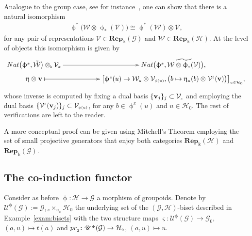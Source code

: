 \documentclass[11pt]{article}
\numberwithin{equation}{section}
\newcommand{\tensor}[1]{\otimes_{\scriptscriptstyle{#1}}}
\newcommand{\Rep}[1]{\mathbf{Rep}_{\Sscript{\Bbbk}}(#1)}
\newcommand{\Go}{\cG_{\Sscript{0}}}
\newcommand{\Ga}{\cG_{\Sscript{1}}}
\newcommand{\Ho}{\cH_{\Sscript{0}}}
\newcommand{\Vx}{\cV_{\Sscript{x}}}
\newcommand{\uU}{\mathscr{U}}
\newcommand{\cG}{{\mathcal G}}
\newcommand{\cH}{{\mathcal H}}
\newcommand{\cV}{{\mathcal V}}
\newcommand{\cW}{{\mathcal W}}
\newcommand{\Sscript}[1]{\scriptscriptstyle{#1}}
\newcommand{\due}[3]{{}_{{#2 }} {#1}_{{ #3}} }
\newcommand{\upg}{\uU^{\Sscript{\upphi}}(\cG)}
\begin{document}
\begin{Remark}\label{rem:PFromula}Analogue to the group case, see for instance~\cite[Proposition~2.10.18]{Kowalski:2014}, one can show that there is a natural isomorphism
\begin{gather*}
\upphi^{\Sscript{*}}\big( \cW \tensor{}\upphi_{\Sscript{*}}(\cV)\big) \cong \upphi^{\Sscript{*}}(\cW)\tensor{} \cV,
\end{gather*}
for any pair of representations $\cV \in \Rep{\cG}$ and $\cW \in \Rep{\cH}$. At the level of objects this isomorphism is given by
\begin{gather*}
\xymatrix@R=0pt{ {\rm Nat}\big(\upphi^{\Sscript{x}}, \tilde{\cW}\big) \tensor{\Bbbk} \Vx \ar@{->}^-{}[rr] & & {\rm Nat}\big(\upphi^{\Sscript{x}}, \widetilde{\cW
\tensor{}\upphi_{\Sscript{*}}(\cV)}\big), \\ \upeta\tensor{} {\bf{v}} \ar@{|->}^-{}[rr] & & \big[ \upphi^{\Sscript{x}}(u) \to \cW_{\Sscript{u}}\tensor{}\cV_{\Sscript{\phi(u)}}, \big( b \mapsto \upeta_{\Sscript{u}}(b)\tensor{}\cV^{\Sscript{b}}({\bf{v}})\big) \big]_{\Sscript{u \in \Ho}}, }
\end{gather*}
whose inverse is computed by fixing a dual basis $\{{\bf{v}}_j\}_{j} \subset \Vx$ and employing the dual basis $\{\cV^{\Sscript{b}}({\bf{v}}_j)\}_{j} \subset \cV_{\Sscript{\phi(u)}}$, for any $b \in \upphi^{\Sscript{x}}(u)$ and $u \in \Ho$. The rest of verifications are left to the reader.

A more conceptual proof can be given using Mitchell's Theorem \cite[Theorem 4.5.2]{Mitchell:1965} employing the set of small projective generators that enjoy both categories $\Rep{\cH}$ and $\Rep{\cG}$.
\end{Remark}

\subsection{The co-induction functor}\label{ssec:coInd}
Consider as before $\upphi\colon \cH \to \cG$ a morphism of groupoids. Denote by $\upg:=\Ga \due \times {\Sscript{s}}{ \Sscript{\upphi_0} } \Ho$ the underlying set of the $(\cG,\cH)$-biset described in Example~\ref{exam:bisets} with the two structure maps $ \varsigma\colon \upg \to \Go$, $(a,u) \mapsto t(a)$ and ${\rm pr}_{\Sscript{2}}\colon \upg \to \Ho$, $(a,u) \mapsto u$.
\end{document}

